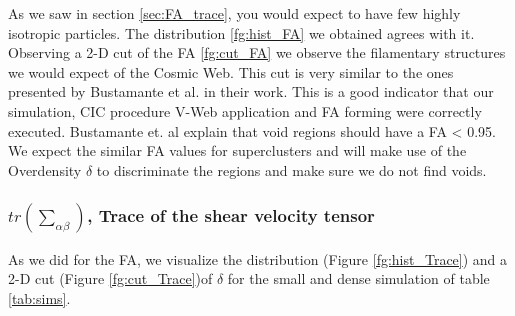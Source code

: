 \documentclass[12pt]{article}
\begin{document}
\begin{par}
As we saw in section \ref{sec:FA_trace}, you would
 expect to have few highly isotropic particles.
  The distribution \ref{fg:hist_FA} we obtained
   agrees with it.\\
Observing a 2-D cut of the FA \ref{fg:cut_FA} we
 observe the filamentary structures we would
  expect of the Cosmic Web. This cut is very
   similar to the ones presented by  Bustamante et
   al.  \cite{bustamante_tensor_2015} in their
    work. This is a good indicator that our
     simulation, CIC procedure V-Web application
      and FA forming were correctly executed.
       Bustamante et. al  explain that void
        regions should have a FA < 0.95. We expect
         the similar FA values for superclusters
          and will make use of the Overdensity
           $\delta$ to discriminate the    
            regions and make sure we do not find
             voids.

\end{par}


\subsubsection{$tr \left(\sum_{\alpha\beta}\right)$, Trace of the shear velocity tensor}
As we did for the FA, we visualize the
 distribution (Figure \ref{fg:hist_Trace}) and a
  2-D cut (Figure \ref{fg:cut_Trace})of $\delta$
   for the small and dense simulation of table
    \ref{tab:sims}.
\end{document}
